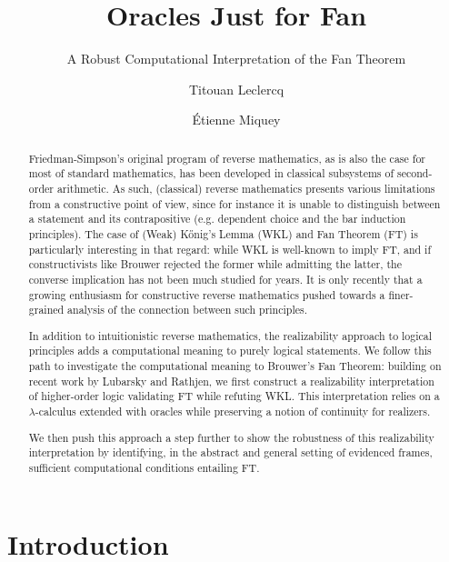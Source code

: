 \documentclass[a4paper,UKenglish,cleveref, autoref, thm-restate]{lipics-v2021}
\title{Oracles Just for Fan}
\subtitle{A Robust Computational Interpretation of the Fan Theorem}
\author{Titouan Leclercq}{Aix Marseille University, CNRS, I2M, Marseille, France}{titouan.leclercq@univ-amu.fr	}{}{}
\author{\'{E}tienne Miquey}{Aix Marseille University, CNRS, I2M, Marseille, France}{etienne.miquey@univ-amu.fr	}{0000-0002-5987-6547}{}
\begin{document}
\maketitle

\begin{abstract}
 Friedman-Simpson’s original program of reverse mathematics,
as is also the case for most of standard mathematics,
has been developed in classical subsystems of second-order
arithmetic. As such, (classical) reverse mathematics
presents various limitations from a constructive point of view,
since for instance it is unable to distinguish between
a statement and its contrapositive (e.g. dependent choice and
the bar induction principles).
The case of (Weak) Kőnig's Lemma (WKL) and Fan Theorem (FT)
is particularly interesting in that regard:
while WKL is well-known to imply FT, and if constructivists like
Brouwer rejected the former while admitting the latter,
the converse implication has not been much studied for years.
It is only recently that a growing enthusiasm for constructive reverse
mathematics pushed towards a finer-grained analysis of the connection
between such principles.

In addition to intuitionistic reverse mathematics, the realizability approach to logical principles adds a computational meaning to purely logical statements. We follow this path to investigate the computational meaning to Brouwer's Fan Theorem: building on recent work by Lubarsky and Rathjen, we first construct a realizability interpretation of higher-order logic validating FT while refuting WKL. This interpretation relies on a $\lambda$-calculus extended with oracles while preserving a notion of continuity for realizers.

We then push this approach a step further to show the robustness of this realizability interpretation by identifying, in the abstract and general setting of evidenced frames, sufficient computational conditions entailing FT.
\end{abstract}


\section{Introduction}
\end{document}

